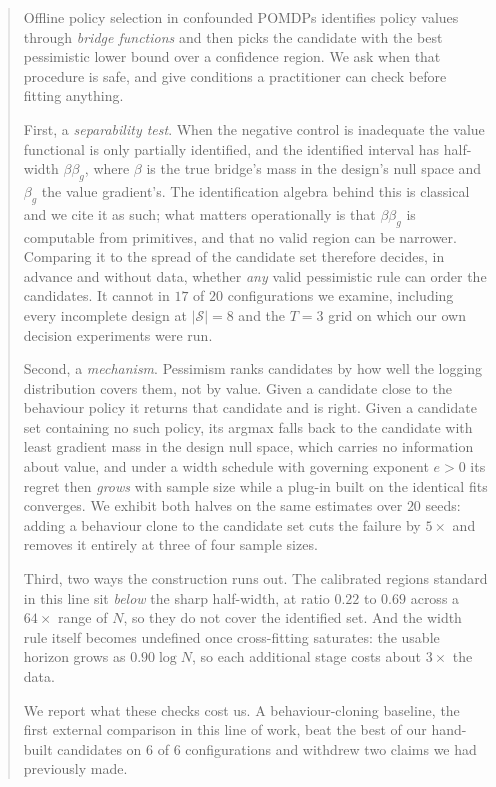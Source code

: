 \documentclass{article}
\theoremstyle{plain}
\theoremstyle{definition}
\begin{document}
\begin{abstract}
Offline policy selection in confounded POMDPs identifies policy values through
\emph{bridge functions} and then picks the candidate with the best pessimistic
lower bound over a confidence region. We ask when that procedure is safe, and
give conditions a practitioner can check before fitting anything.

First, a \emph{separability test}. When the negative control is inadequate the
value functional is only partially identified, and the identified interval has
half-width $\beta\beta_g$, where $\beta$ is the true bridge's mass in the design's
null space and $\beta_g$ the value gradient's. The identification algebra behind
this is classical and we cite it as such; what matters operationally is that
$\beta\beta_g$ is computable from primitives, and that no valid region can be
narrower. Comparing it to the spread of the candidate set therefore decides, in
advance and without data, whether \emph{any} valid pessimistic rule can order the
candidates. It cannot in $17$ of $20$ configurations we examine, including every
incomplete design at $|\mathcal{S}|=8$ and the $T{=}3$ grid on which our own
decision experiments were run.

Second, a \emph{mechanism}. Pessimism ranks candidates by how well the logging
distribution covers them, not by value. Given a candidate close to the behaviour
policy it returns that candidate and is right. Given a candidate set containing
no such policy, its argmax falls back to the candidate with least gradient mass
in the design null space, which carries no information about value, and under a
width schedule with governing exponent $e>0$ its regret then \emph{grows} with
sample size while a plug-in built on the identical fits converges. We exhibit
both halves on the same estimates over $20$ seeds: adding a behaviour clone to
the candidate set cuts the failure by $5\times$ and removes it entirely at three
of four sample sizes.

Third, two ways the construction runs out. The calibrated regions standard in
this line sit \emph{below} the sharp half-width, at ratio $0.22$ to $0.69$ across
a $64\times$ range of $N$, so they do not cover the identified set. And the width
rule itself becomes undefined once cross-fitting saturates: the usable horizon
grows as $0.90\log N$, so each additional stage costs about $3\times$ the data.

We report what these checks cost us. A behaviour-cloning baseline, the first
external comparison in this line of work, beat the best of our hand-built
candidates on $6$ of $6$ configurations and withdrew two claims we had previously
made.
\end{abstract}
\end{document}
